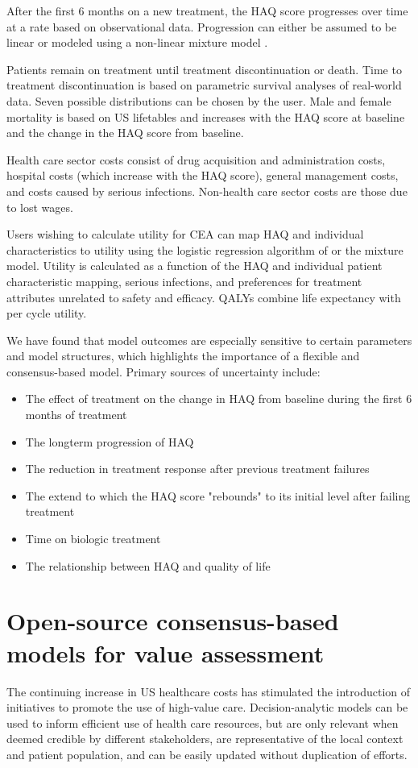 \documentclass[11pt,final,fleqn]{article}\usepackage[]{graphicx}\usepackage[]{color}
\theoremstyle{plain}
\begin{document}
After the first 6 months on a new treatment, the HAQ score progresses over time at a rate based on observational data. Progression can either be assumed to be linear \citep{wolfe2010loss, michaud2011treatment} or modeled using a non-linear mixture model \citep{norton2014health}. 

Patients remain on treatment until treatment discontinuation or death. Time to treatment discontinuation is based on parametric survival analyses of real-world data. Seven possible distributions can be chosen by the user. Male and female mortality is based on US lifetables and increases with the HAQ score at baseline and the change in the HAQ score from baseline. 

Health care sector costs consist of drug acquisition and administration costs, hospital costs (which increase with the HAQ score), general management costs, and costs caused by serious infections. Non-health care sector costs are those due to lost wages.

Users wishing to calculate utility for CEA can map HAQ and individual characteristics to utility using the logistic regression algorithm of \citet{wailoo2006modeling} or the \citet{alava2013relationship} mixture model. Utility is calculated as a function of the HAQ and individual patient characteristic mapping, serious infections, and preferences for treatment attributes unrelated to safety and efficacy. QALYs combine life expectancy with per cycle utility.  

We have found that model outcomes are especially sensitive to certain parameters and model structures, which highlights the importance of a flexible and consensus-based model. Primary sources of uncertainty include:

\begin{itemize}
\item The effect of treatment on the change in HAQ from baseline during the first 6 months of treatment
\item The longterm progression of HAQ
\item The reduction in treatment response after previous treatment failures
\item The extend to which the HAQ score "rebounds" to its initial level after failing treatment
\item Time on biologic treatment
\item The relationship between HAQ and quality of life
\end{itemize}

\section{Open-source consensus-based models for value assessment}\label{sec:osvp}
The continuing increase in US healthcare costs has stimulated the introduction of initiatives to promote the use of high-value care. Decision-analytic models can be used to inform efficient use of health care resources, but are only relevant when deemed credible by different stakeholders, are representative of the local context and patient population, and can be easily updated without duplication of efforts.
\end{document}
